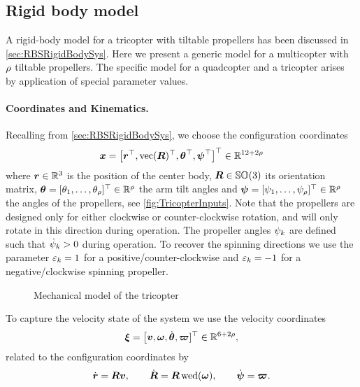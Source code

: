 \subsection{Rigid body model}
A rigid-body model for a tricopter with tiltable propellers has been discussed in \autoref{sec:RBSRigidBodySys}.
Here we present a generic model for a multicopter with $\numProp$ tiltable propellers.
The specific model for a quadcopter and a tricopter arises by application of special parameter values.

\paragraph{Coordinates and Kinematics.}
Recalling from \autoref{sec:RBSRigidBodySys}, we choose the configuration coordinates 
\begin{align}
 \sysCoord = \big[ \r^\top, \vectorize(\R)^\top, \tuple{\PropTilt}^\top, \tuple{\PropAngle}^\top \big]^\top \in \RealNum^{12+2\numProp}
\end{align}
where $\r \in \RealNum^3$ is the position of the center body, $\R \in \SpecialOrthogonalGroup(3)$ its orientation matrix, $\tuple{\PropTilt} = [\PropTilt[1], \ldots, \PropTilt[\numProp]]^\top \in \RealNum^{\numProp}$ the arm tilt angles and $\tuple{\PropAngle} = [\PropAngle[1],\ldots,\PropAngle[\numProp]]^\top \in \RealNum^{\numProp}$ the angles of the propellers, see \autoref{fig:TricopterInputs}.
Note that the propellers are designed only for either clockwise or counter-clockwise rotation, and will only rotate in this direction during operation.
The propeller angles $\PropAngle[k]$ are defined such that $\PropAngled[k] > 0$ during operation.
To recover the spinning directions we use the parameter $\PropDir[k] = 1$ for a positive/counter-clockwise and $\PropDir[k] = -1$ for a negative/clockwise spinning propeller.

\begin{figure}
 \centering
 
 \caption{Mechanical model of the tricopter}
 \label{fig:TricopterInputs}
\end{figure}

To capture the velocity state of the system we use the velocity coordinates
\begin{align}
 \sysVel = \big[ \v, \w, \dot{\tuple{\PropTilt}}, \tuple{\PropVel}]^\top \in \RealNum^{6+2\numProp},
\end{align}
related to the configuration coordinates by
\begin{align}
 \rd = \R \v, 
\qquad
 \Rd = \R \wedOp(\w),
\qquad
 \dot{\tuple{\PropAngle}} = \tuple{\PropVel}.
\end{align}

